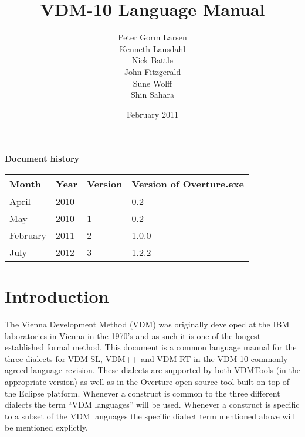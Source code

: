 \documentclass{overturerepchap}
\begin{document}
 
\title{VDM-10 Language Manual}
\author{Peter Gorm Larsen\\
        Kenneth Lausdahl\\
        Nick Battle\\
        John Fitzgerald\\
        Sune Wolff\\
	Shin Sahara}

\date{February 2011}

\maketitle


{\textbf{Document history}}

\begin{tabular}{|l|l|l|l|}\hline
Month   & Year & Version & Version of Overture.exe \\ \hline
April   & 2010 &         & 0.2   \\ \hline
May     & 2010 & 1       & 0.2   \\ \hline
February& 2011 & 2       & 1.0.0 \\ \hline
July    & 2012 & 3       & 1.2.2 \\ \hline
\end{tabular}

\tableofcontents
\newpage
\mbox{}
\newpage
{} 
\setcounter{page}{1}

\chapter{Introduction}

The Vienna Development Method (VDM)
\cite{Bjorner&78,Jones90a,Fitzgerald&08c} was originally developed at
the IBM laboratories in Vienna in the 1970's and as such it is one of
the longest established formal method.
This document is a common language manual for the three dialects for
VDM-SL, VDM++ and VDM-RT in the VDM-10 commonly agreed language
revision. These dialects are supported by both VDMTools
\cite{Fitzgerald&08a} (in the appropriate version) as well as in the
Overture open source tool \cite{Larsen&10a} built on top of the
Eclipse platform. Whenever a construct is common to the three
different dialects the term ``VDM languages'' will be used. Whenever a
construct is specific to a subset of the VDM languages the specific
dialect term mentioned above will be mentioned explictly.
\end{document}
